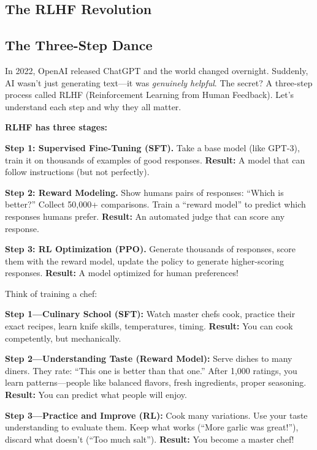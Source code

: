 \begin{chapterenv}

\chapter{The RLHF Revolution}

\section{The Three-Step Dance}

In 2022, OpenAI released ChatGPT and the world changed overnight. Suddenly, AI wasn't just generating text---it was \textit{genuinely helpful}. The secret? A three-step process called RLHF (Reinforcement Learning from Human Feedback). Let's understand each step and why they all matter.

\textbf{RLHF has three stages:}

\textbf{Step 1: Supervised Fine-Tuning (SFT).} Take a base model (like GPT-3), train it on thousands of examples of good responses. \textbf{Result:} A model that can follow instructions (but not perfectly).

\textbf{Step 2: Reward Modeling.} Show humans pairs of responses: ``Which is better?'' Collect 50,000+ comparisons. Train a ``reward model'' to predict which responses humans prefer. \textbf{Result:} An automated judge that can score any response.

\textbf{Step 3: RL Optimization (PPO).} Generate thousands of responses, score them with the reward model, update the policy to generate higher-scoring responses. \textbf{Result:} A model optimized for human preferences!

\begin{infobox}
Think of training a chef:

\textbf{Step 1---Culinary School (SFT):} Watch master chefs cook, practice their exact recipes, learn knife skills, temperatures, timing. \textbf{Result:} You can cook competently, but mechanically.

\textbf{Step 2---Understanding Taste (Reward Model):} Serve dishes to many diners. They rate: ``This one is better than that one.'' After 1,000 ratings, you learn patterns---people like balanced flavors, fresh ingredients, proper seasoning. \textbf{Result:} You can predict what people will enjoy.

\textbf{Step 3---Practice and Improve (RL):} Cook many variations. Use your taste understanding to evaluate them. Keep what works (``More garlic was great!''), discard what doesn't (``Too much salt''). \textbf{Result:} You become a master chef!


\end{infobox}
\end{chapterenv}
